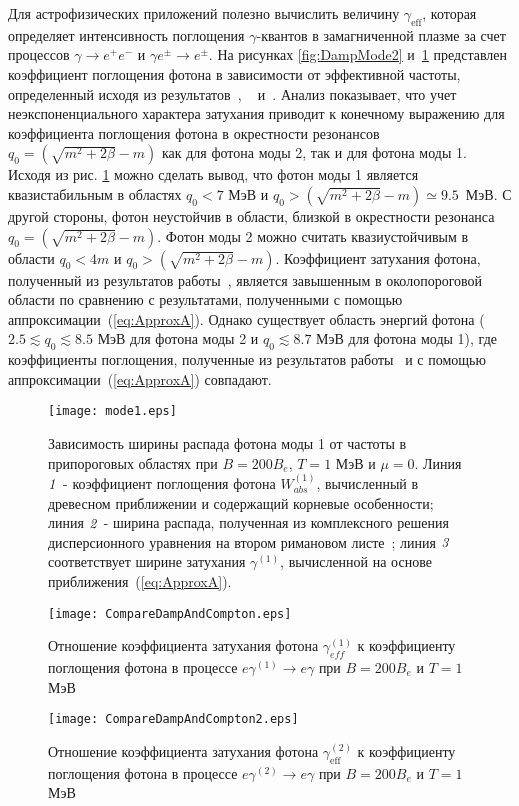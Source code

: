 Для астрофизических приложений полезно вычислить величину $\gamma_\text{eff}$, которая определяет интенсивность поглощения 
$\gamma$-квантов в замагниченной плазме за счет  процессов $\gamma \to e^+ 
e^-$  и $\gamma e^{\pm} \to e^{\pm}$. На рисунках \ref{fig:DampMode2} 
и~\ref{fig:DampMode1} представлен коэффициент поглощения фотона в зависимости 
от эффективной частоты, определенный исходя из результатов~\cite{Shabad:1988}, 
~\cite{Klepikov:1954} и~\cite{YarkovPhotDampPAN:2022}. 
Анализ показывает, что учет
неэкспоненциального характера 
затухания приводит к конечному выражению для коэффициента  поглощения фотона в окрестности резонансов 
$q_0 = (\sqrt{m^2+2 \beta} - m )$ как для фотона моды 2, так и для фотона моды 
1. Исходя из рис. \ref{fig:DampMode1} можно сделать вывод, что фотон моды 1 
является квазистабильным в областях $q_0<7$ МэВ и $q_0>(\sqrt{m^2+2 \beta} - 
m)\simeq 9.5$~МэВ. С другой стороны, фотон неустойчив в области, близкой в 
окрестности резонанса $q_0 = (\sqrt{m^2+2 \beta} - m )$. Фотон моды 2 можно 
считать квазиустойчивым в области $q_0<4m$ и $q_0>(\sqrt{m^2+2 \beta} - m)$. 
Коэффициент затухания фотона, полученный из результатов 
работы~\cite{Shabad:1988}, является завышенным в околопороговой области по 
сравнению с результатами, полученными с помощью 
аппроксимации~(\ref{eq:ApproxA}). Однако существует область энергий фотона 
($2.5\lesssim q_0\lesssim 8.5$ МэВ для фотона моды 2 и $q_0\lesssim8.7$ МэВ для 
фотона моды 1), где коэффициенты поглощения, полученные из результатов 
работы~\cite{Shabad:1988} и с помощью аппроксимации~(\ref{eq:ApproxA}) 
совпадают.


\begin{figure}[t]\centering
	\texttt{[image: mode1.eps]}
	\caption{\label{fig:fig1}Зависимость ширины распада фотона моды 1 от частоты в припороговых областях при $B=200 B_e$, $T=1$ МэВ и $ \mu=0 $. Линия $ {\it 1} $ - коэффициент поглощения фотона $ W ^ {(1)}_{abs} $,
		вычисленный в древесном приближении и содержащий корневые особенности; линия $ {\it 2} $ - ширина распада, полученная из комплексного решения дисперсионного уравнения на втором римановом листе~\cite{Shabad:1988}; линия $ {\it 3} $ соответствует ширине затухания $ \gamma^{(1)}$, вычисленной на основе приближения~(\ref{eq:ApproxA}).}\label{fig:DampMode1}
\end{figure}

\begin{figure}[t!]\centering
	\texttt{[image: CompareDampAndCompton.eps]}
	\caption{\label{fig:ComptonandDamp} Отношение коэффициента затухания фотона $\gamma_{eff}^{(1)}$ к коэффициенту поглощения фотона в процессе $e\gamma^{(1)}\to e\gamma$ при $B=200B_e$ и $T=1$ МэВ}
\end{figure}
\clearpage
\begin{figure}[t!]\centering
	\texttt{[image: CompareDampAndCompton2.eps]}
	\caption{\label{fig:ComptonandDamp2} Отношение коэффициента затухания фотона $\gamma_\text{eff}^{(2)}$ к коэффициенту поглощения фотона в процессе $e\gamma^{(2)}\to e\gamma$ при $B=200B_e$ и $T=1$ МэВ}
\end{figure}


